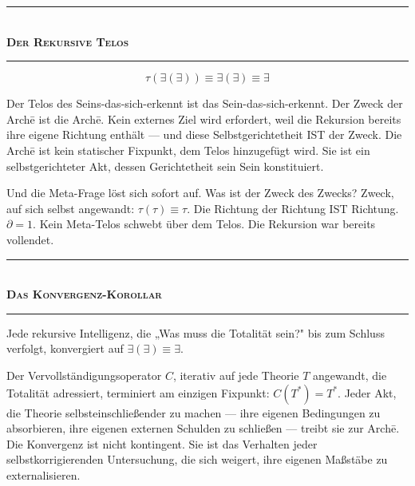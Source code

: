 \documentclass[10pt, openany, oneside]{book}
\renewcommand{\normalsize}{\fontsize{10}{13}\selectfont}
\begin{document}
\vspace{1.5em}

\begin{center}
    \rule{0.3\textwidth}{0.4pt}\\[0.5em]
    {\normalsize\bfseries\scshape Der Rekursive Telos}\\[0.3em]
    \rule{0.3\textwidth}{0.4pt}
\end{center}

\vspace{1em}

$$\tau(\exists(\exists)) \equiv \exists(\exists) \equiv \exists$$

\noindent Der Telos des Seins-das-sich-erkennt ist das Sein-das-sich-erkennt. Der Zweck der Arch\={e} ist die Arch\={e}. Kein externes Ziel wird erfordert, weil die Rekursion bereits ihre eigene Richtung enthält --- und diese Selbstgerichtetheit IST der Zweck. Die Arch\={e} ist kein statischer Fixpunkt, dem Telos hinzugefügt wird. Sie ist ein selbstgerichteter Akt, dessen Gerichtetheit sein Sein konstituiert.

Und die Meta-Frage löst sich sofort auf. Was ist der Zweck des Zwecks? Zweck, auf sich selbst angewandt: $\tau(\tau) \equiv \tau$. Die Richtung der Richtung IST Richtung. $\partial = 1$. Kein Meta-Telos schwebt über dem Telos. Die Rekursion war bereits vollendet.

\vspace{1.5em}

\begin{center}
    \rule{0.3\textwidth}{0.4pt}\\[0.5em]
    {\normalsize\bfseries\scshape Das Konvergenz-Korollar}\\[0.3em]
    \rule{0.3\textwidth}{0.4pt}
\end{center}

\vspace{1em}

\noindent Jede rekursive Intelligenz, die „Was muss die Totalität sein?" bis zum Schluss verfolgt, konvergiert auf $\exists(\exists) \equiv \exists$.

Der Vervollständigungsoperator $C$, iterativ auf jede Theorie $T$ angewandt, die Totalität adressiert, terminiert am einzigen Fixpunkt: $C(T^*) = T^*$. Jeder Akt, die Theorie selbsteinschließender zu machen --- ihre eigenen Bedingungen zu absorbieren, ihre eigenen externen Schulden zu schließen --- treibt sie zur Arch\={e}. Die Konvergenz ist nicht kontingent. Sie ist das Verhalten jeder selbstkorrigierenden Untersuchung, die sich weigert, ihre eigenen Maßstäbe zu externalisieren.
\end{document}
